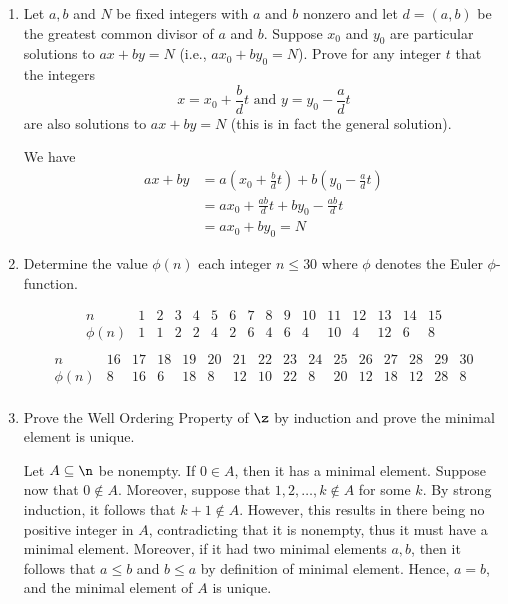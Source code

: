 \begin{enumerate}
\begin{sol}
    \end{sol}
    \item Let $a, b$ and $N$ be fixed integers with $a$ and $b$ nonzero and let $d = (a, b)$ be the greatest common divisor of $a$ and $b$. Suppose $x_0$ and $y_0$ are particular solutions to $ax + by = N$ (i.e., $ax_0 + by_0 = N$). Prove for any integer $t$ that the integers
    $$x = x_0 + \frac bdt \text{ and } y = y_0 - \frac adt$$
    are also solutions to $ax + by = N$ (this is in fact the general solution).
    \begin{sol}
        We have
        \begin{align*}
            ax + by & = a\left(x_0 + \frac bdt\right) + b\left(y_0 - \frac adt\right) \\
            & = ax_0 + \frac{ab}{d}t + by_0 - \frac{ab}{d}t \\
            & = ax_0 + by_0 = N
        \end{align*}
    \end{sol}
    \item Determine the value $\phi(n)$  each integer $n \leq 30$ where $\phi$ denotes the Euler $\phi$-function.
    \begin{sol}
        $$\begin{array}{c|c|c|c|c|c|c|c|c|c|c|c|c|c|c|c}
            n & 1 & 2 & 3 & 4 & 5 & 6 & 7 & 8 & 9 & 10 & 11 & 12 & 13 & 14 & 15 \\
            \hline
            \phi(n) & 1 & 1 & 2 & 2 & 4 & 2 & 6 & 4 & 6 & 4 & 10 & 4 & 12 & 6 & 8 \\
        \end{array}$$
        $$\begin{array}{c|c|c|c|c|c|c|c|c|c|c|c|c|c|c|c}
            n & 16 & 17 & 18 & 19 & 20 & 21 & 22 & 23 & 24 & 25 & 26 & 27 & 28 & 29 & 30 \\
            \hline
            \phi(n) & 8 & 16 & 6 & 18 & 8 & 12 & 10 & 22 & 8 & 20 & 12 & 18 & 12 & 28 & 8 \\
        \end{array}$$
    \end{sol}
    \item Prove the Well Ordering Property of $\z$ by induction and prove the minimal element is unique.
    \begin{sol}
        Let $A \subseteq \n$ be nonempty. If $0 \in A$, then it has a minimal element. Suppose now that $0 \not\in A$. Moreover, suppose that $1, 2, \ldots, k \not\in A$ for some $k$. By strong induction, it follows that $k + 1 \not\in A$. However, this results in there being no positive integer in $A$, contradicting that it is nonempty, thus it must have a minimal element. Moreover, if it had two minimal elements $a, b$, then it follows that $a \leq b$ and $b \leq a$ by definition of minimal element. Hence, $a = b$, and the minimal element of $A$ is unique.

\end{sol}
\end{enumerate}
